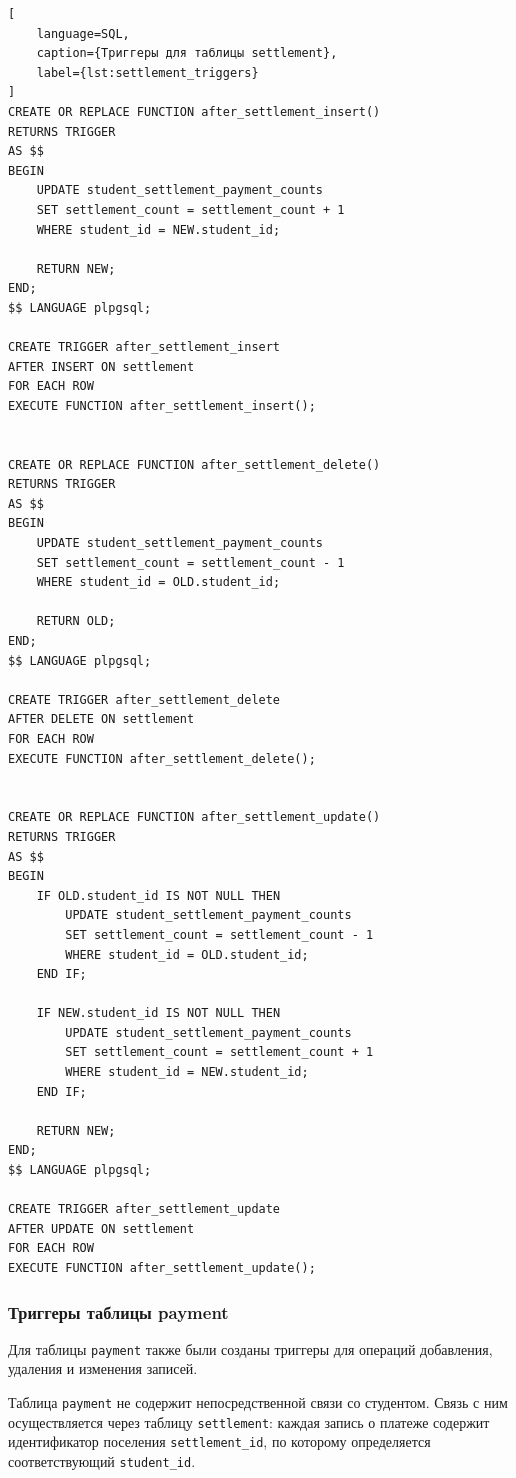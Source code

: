 \begin{lstlisting}[
    language=SQL,
    caption={Триггеры для таблицы settlement},
    label={lst:settlement_triggers}
]
CREATE OR REPLACE FUNCTION after_settlement_insert()
RETURNS TRIGGER
AS $$
BEGIN
    UPDATE student_settlement_payment_counts
    SET settlement_count = settlement_count + 1
    WHERE student_id = NEW.student_id;

    RETURN NEW;
END;
$$ LANGUAGE plpgsql;

CREATE TRIGGER after_settlement_insert
AFTER INSERT ON settlement
FOR EACH ROW
EXECUTE FUNCTION after_settlement_insert();


CREATE OR REPLACE FUNCTION after_settlement_delete()
RETURNS TRIGGER
AS $$
BEGIN
    UPDATE student_settlement_payment_counts
    SET settlement_count = settlement_count - 1
    WHERE student_id = OLD.student_id;

    RETURN OLD;
END;
$$ LANGUAGE plpgsql;

CREATE TRIGGER after_settlement_delete
AFTER DELETE ON settlement
FOR EACH ROW
EXECUTE FUNCTION after_settlement_delete();


CREATE OR REPLACE FUNCTION after_settlement_update()
RETURNS TRIGGER
AS $$
BEGIN
    IF OLD.student_id IS NOT NULL THEN
        UPDATE student_settlement_payment_counts
        SET settlement_count = settlement_count - 1
        WHERE student_id = OLD.student_id;
    END IF;

    IF NEW.student_id IS NOT NULL THEN
        UPDATE student_settlement_payment_counts
        SET settlement_count = settlement_count + 1
        WHERE student_id = NEW.student_id;
    END IF;

    RETURN NEW;
END;
$$ LANGUAGE plpgsql;

CREATE TRIGGER after_settlement_update
AFTER UPDATE ON settlement
FOR EACH ROW
EXECUTE FUNCTION after_settlement_update();
\end{lstlisting}

\subsubsection{Триггеры таблицы payment}

Для таблицы \texttt{payment} также были созданы триггеры для операций добавления, удаления и изменения записей.

Таблица \texttt{payment} не содержит непосредственной связи со студентом. Связь с ним осуществляется через таблицу \texttt{settlement}: каждая запись о платеже содержит идентификатор поселения \texttt{settlement\_id}, по которому определяется соответствующий \texttt{student\_id}.

